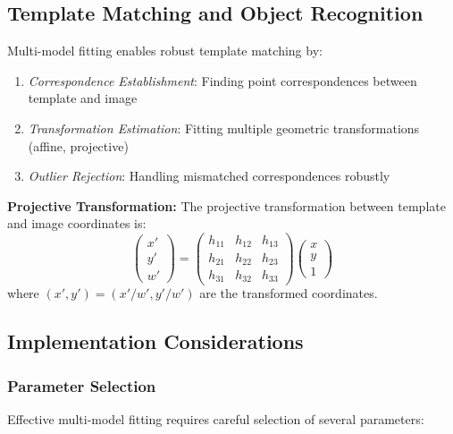 \documentclass[12pt]{article}
\begin{document}
\subsection{Template Matching and Object Recognition}
\label{subsec:template_matching}

Multi-model fitting enables robust template matching by:
\begin{enumerate}
    \item \textit{Correspondence Establishment}: Finding point correspondences between template and image
    \item \textit{Transformation Estimation}: Fitting multiple geometric transformations (affine, projective)
    \item \textit{Outlier Rejection}: Handling mismatched correspondences robustly
\end{enumerate}

\textbf{Projective Transformation:} The projective transformation between template and image coordinates is:
\begin{equation}
    \begin{pmatrix} x' \\ y' \\ w' \end{pmatrix} = \begin{pmatrix} h_{11} & h_{12} & h_{13} \\ h_{21} & h_{22} & h_{23} \\ h_{31} & h_{32} & h_{33} \end{pmatrix} \begin{pmatrix} x \\ y \\ 1 \end{pmatrix}
    \label{eq:projective_transform}
\end{equation}
where $(x', y') = (x'/w', y'/w')$ are the transformed coordinates.

\subsection{Implementation Considerations}
\label{subsec:implementation}

\subsubsection{Parameter Selection}
\label{subsubsec:parameter_selection}

Effective multi-model fitting requires careful selection of several parameters:
\end{document}
